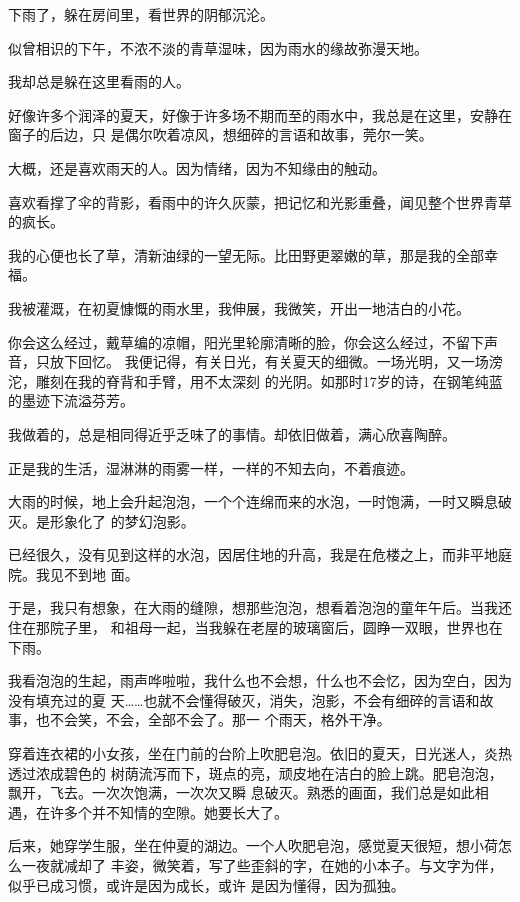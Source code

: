 	\endwriting



		下雨了，躲在房间里，看世界的阴郁沉沦。

		似曾相识的下午，不浓不淡的青草湿味，因为雨水的缘故弥漫天地。

		我却总是躲在这里看雨的人。

		好像许多个润泽的夏天，好像于许多场不期而至的雨水中，我总是在这里，安静在窗子的后边，只
	是偶尔吹着凉风，想细碎的言语和故事，莞尔一笑。

		大概，还是喜欢雨天的人。因为情绪，因为不知缘由的触动。

		喜欢看撑了伞的背影，看雨中的许久灰蒙，把记忆和光影重叠，闻见整个世界青草的疯长。

		我的心便也长了草，清新油绿的一望无际。比田野更翠嫩的草，那是我的全部幸福。

		我被灌溉，在初夏慷慨的雨水里，我伸展，我微笑，开出一地洁白的小花。

		你会这么经过，戴草编的凉帽，阳光里轮廓清晰的脸，你会这么经过，不留下声音，只放下回忆。
	我便记得，有关日光，有关夏天的细微。一场光明，又一场滂沱，雕刻在我的脊背和手臂，用不太深刻
	的光阴。如那时17岁的诗，在钢笔纯蓝的墨迹下流溢芬芳。

		我做着的，总是相同得近乎乏味了的事情。却依旧做着，满心欣喜陶醉。

		正是我的生活，湿淋淋的雨雾一样，一样的不知去向，不着痕迹。

		大雨的时候，地上会升起泡泡，一个个连绵而来的水泡，一时饱满，一时又瞬息破灭。是形象化了
	的梦幻泡影。

		已经很久，没有见到这样的水泡，因居住地的升高，我是在危楼之上，而非平地庭院。我见不到地
	面。

		于是，我只有想象，在大雨的缝隙，想那些泡泡，想看着泡泡的童年午后。当我还住在那院子里，
	和祖母一起，当我躲在老屋的玻璃窗后，圆睁一双眼，世界也在下雨。

		我看泡泡的生起，雨声哗啦啦，我什么也不会想，什么也不会忆，因为空白，因为没有填充过的夏
	天……也就不会懂得破灭，消失，泡影，不会有细碎的言语和故事，也不会笑，不会，全部不会了。那一
	个雨天，格外干净。

		穿着连衣裙的小女孩，坐在门前的台阶上吹肥皂泡。依旧的夏天，日光迷人，炎热透过浓成碧色的
	树荫流泻而下，斑点的亮，顽皮地在洁白的脸上跳。肥皂泡泡，飘开，飞去。一次次饱满，一次次又瞬
	息破灭。熟悉的画面，我们总是如此相遇，在许多个并不知情的空隙。她要长大了。

		后来，她穿学生服，坐在仲夏的湖边。一个人吹肥皂泡，感觉夏天很短，想小荷怎么一夜就减却了
	丰姿，微笑着，写了些歪斜的字，在她的小本子。与文字为伴，似乎已成习惯，或许是因为成长，或许
	是因为懂得，因为孤独。

